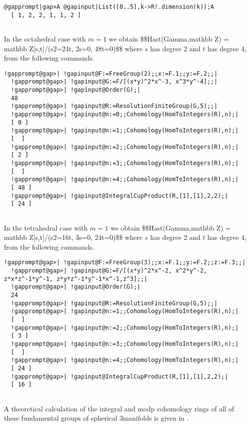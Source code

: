 \documentclass[a4paper,11pt]{report}
\begin{document}
{{\begin{Verbatim}[commandchars=@|A,fontsize=\small,frame=single,label=Example]
  @gapprompt|gap>A @gapinput|List([0..5],k->R!.dimension(k));A
  [ 1, 2, 2, 1, 1, 2 ]
  
\end{Verbatim}
 In the octahedral case with $m=1$ we obtain
\$\$H\texttt{}\texttt{}ast(\texttt{}Gamma,\texttt{}mathbb
Z) = \texttt{}mathbb Z[s,t]/(s\texttt{}2=24t, 2s=0,
48t=0)\$\$ where $s$ has degree 2 and $t$ has degree 4, from the following commands. 
\begin{Verbatim}[commandchars=!@|,fontsize=\small,frame=single,label=Example]
  !gapprompt@gap>| !gapinput@F:=FreeGroup(2);;x:=F.1;;y:=F.2;;|
  !gapprompt@gap>| !gapinput@G:=F/[(x*y)^2*x^-3, x^3*y^-4];;|
  !gapprompt@gap>| !gapinput@Order(G);|
  48
  !gapprompt@gap>| !gapinput@R:=ResolutionFiniteGroup(G,5);;|
  !gapprompt@gap>| !gapinput@n:=0;;Cohomology(HomToIntegers(R),n);|
  [ 0 ]
  !gapprompt@gap>| !gapinput@n:=1;;Cohomology(HomToIntegers(R),n);|
  [  ]
  !gapprompt@gap>| !gapinput@n:=2;;Cohomology(HomToIntegers(R),n);|
  [ 2 ]
  !gapprompt@gap>| !gapinput@n:=3;;Cohomology(HomToIntegers(R),n);|
  [  ]
  !gapprompt@gap>| !gapinput@n:=4;;Cohomology(HomToIntegers(R),n);|
  [ 48 ]
  !gapprompt@gap>| !gapinput@IntegralCupProduct(R,[1],[1],2,2);|
  [ 24 ]
  
\end{Verbatim}
 In the tetrahedral case with $m=1$ we obtain
\$\$H\texttt{}\texttt{}ast(\texttt{}Gamma,\texttt{}mathbb
Z) = \texttt{}mathbb Z[s,t]/(s\texttt{}2=16t, 3s=0,
24t=0)\$\$ where $s$ has degree 2 and $t$ has degree 4, from the following commands. 
\begin{Verbatim}[commandchars=!@|,fontsize=\small,frame=single,label=Example]
  !gapprompt@gap>| !gapinput@F:=FreeGroup(3);;x:=F.1;;y:=F.2;;z:=F.3;;|
  !gapprompt@gap>| !gapinput@G:=F/[(x*y)^2*x^-2, x^2*y^-2, z*x*z^-1*y^-1, z*y*z^-1*y^-1*x^-1,z^3];;|
  !gapprompt@gap>| !gapinput@Order(G);|
  24
  !gapprompt@gap>| !gapinput@R:=ResolutionFiniteGroup(G,5);;|
  !gapprompt@gap>| !gapinput@n:=1;;Cohomology(HomToIntegers(R),n);|
  [  ]
  !gapprompt@gap>| !gapinput@n:=2;;Cohomology(HomToIntegers(R),n);|
  [ 3 ]
  !gapprompt@gap>| !gapinput@n:=3;;Cohomology(HomToIntegers(R),n);|
  [  ]
  !gapprompt@gap>| !gapinput@n:=4;;Cohomology(HomToIntegers(R),n);|
  [ 24 ]
  !gapprompt@gap>| !gapinput@IntegralCupProduct(R,[1],[1],2,2);|
  [ 16 ]
  
\end{Verbatim}
 A theoretical calculation of the integral and mod\texttt{}p
cohomology rings of all of these fundamental groups of spherical
3\texttt{}manifolds is given in \cite{tomoda}. }

}
\end{document}

